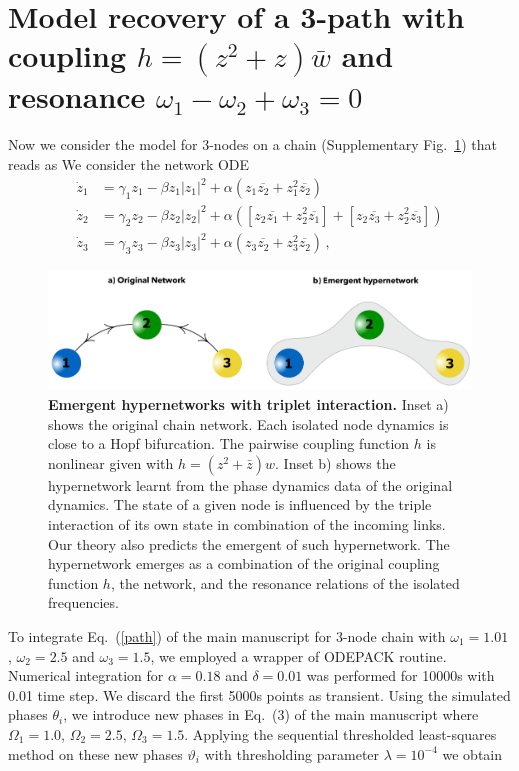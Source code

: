 \documentclass[12pt]{article}
\theoremstyle{plain}
\theoremstyle{definition}
\theoremstyle{remark}
\theoremstyle{remark}
\begin{document}
\section{Model recovery of a 3-path with coupling $h = (z^2 +  z)  \bar w$ and resonance $\omega_1 - \omega_2 + \omega_3 = 0$}\label{numerics4}
Now we consider the model for 3-nodes on a chain (Supplementary Fig.~\ref{fig:3nodes}) that reads as
 We consider the network ODE
\begin{align}\label{path}
\dot{z}_1 &= \gamma_1z_1 - \beta z_1|z_1|^2 + \alpha (z_1\overline{z_2} + z_1^2\overline{z_2} )\\ \nonumber
\dot{z}_2 &= \gamma_2z_2 - \beta z_2|z_2|^2 + \alpha ([z_2\overline{z_1} + z_2^2\overline{z_1} ] + [z_2\overline{z_3} + z_2^2\overline{z_3} ])\\ \nonumber
\dot{z}_3 &= \gamma_3z_3 - \beta z_3|z_3|^2 + \alpha (z_3\overline{z_2} + z_3^2\overline{z_2} ) \,  ,
\end{align}

\begin{figure}[!ht]
    \centering
    \includegraphics[width=0.8\columnwidth]{3nodes_network}
    \caption{{\bf Emergent hypernetworks with triplet interaction.} Inset a) shows the original chain network. Each isolated node dynamics is close to a Hopf bifurcation. The pairwise coupling function $h$ is nonlinear given with $h = (z^2 + \bar z)w$. Inset b) shows the hypernetwork learnt from the phase dynamics data of the original dynamics. The state of a given node is influenced by the triple interaction of its own state in combination of the incoming links. Our theory also predicts the emergent of such hypernetwork. The hypernetwork  emerges as a combination of the original coupling function $h$, the network, and  the resonance relations of the isolated frequencies.}
    \label{fig:3nodes}
\end{figure}
To integrate Eq.~(\ref{path}) of the main manuscript for 3-node chain with  $\omega_1 = 1.01$, $\omega_2 = 2.5$ and $\omega_3 = 1.5$, we employed a wrapper of ODEPACK routine. Numerical integration for $\alpha = 0.18$ and $\delta = 0.01$ was performed for 10000s with 0.01 time step. We discard the first 5000s points as transient. Using the simulated phases $\theta_i$, we introduce new phases in Eq.~(3) of the main manuscript where $\Omega_1 = 1.0$, $\Omega_2 = 2.5$, $\Omega_3 =  1.5$. Applying the sequential thresholded least-squares method  on these new phases $\vartheta_i$ with thresholding parameter $\lambda = 10^{-4}$ we obtain
\end{document}
